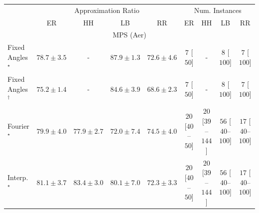 \begin{tabular}{l|cccc|cccc|}
\toprule
& \multicolumn{4}{c|}{Approximation Ratio} & \multicolumn{4}{c|}{Num. Instances} \\
            & ER & HH & LB & RR & ER & HH & LB & RR \\
\midrule
\multicolumn{9}{c}{\rule{0pt}{8pt}MPS (Aer)} \\
\midrule
Fixed Angles$^\star$ & {\cellcolor[HTML]{883E9B}} \color[HTML]{F1F1F1} $78.7\pm 3.5$ & {\cellcolor[HTML]{000000}} \color[HTML]{F1F1F1} {\cellcolor{white}} \color{black} - & {\cellcolor[HTML]{6A0867}} \color[HTML]{F1F1F1} $87.9\pm 1.3$ & {\cellcolor[HTML]{8C66AF}} \color[HTML]{F1F1F1} $72.6\pm 4.6$ & {\cellcolor[HTML]{FFF7F3}} \color[HTML]{000000} $7$ [$50$] & {\cellcolor[HTML]{000000}} \color[HTML]{F1F1F1} {\cellcolor{white}} \color{black} - & {\cellcolor[HTML]{FFF7F3}} \color[HTML]{000000} $8$ [$100$] & {\cellcolor[HTML]{FFF7F3}} \color[HTML]{000000} $7$ [$100$] \\
Fixed Angles$^\dagger$ & {\cellcolor[HTML]{8A55A7}} \color[HTML]{F1F1F1} $75.2\pm 1.4$ & {\cellcolor[HTML]{000000}} \color[HTML]{F1F1F1} {\cellcolor{white}} \color{black} - & {\cellcolor[HTML]{81127E}} \color[HTML]{F1F1F1} $84.6\pm 3.9$ & {\cellcolor[HTML]{8C80BB}} \color[HTML]{F1F1F1} $68.6\pm 2.3$ & {\cellcolor[HTML]{FFF7F3}} \color[HTML]{000000} $7$ [$50$] & {\cellcolor[HTML]{000000}} \color[HTML]{F1F1F1} {\cellcolor{white}} \color{black} - & {\cellcolor[HTML]{FFF7F3}} \color[HTML]{000000} $8$ [$100$] & {\cellcolor[HTML]{FFF7F3}} \color[HTML]{000000} $7$ [$100$] \\
Fourier$^\star$ & {\cellcolor[HTML]{863595}} \color[HTML]{F1F1F1} $79.9\pm 4.0$ & {\cellcolor[HTML]{88449E}} \color[HTML]{F1F1F1} $77.9\pm 2.7$ & {\cellcolor[HTML]{8C6AB1}} \color[HTML]{F1F1F1} $72.0\pm 7.4$ & {\cellcolor[HTML]{8A5AA9}} \color[HTML]{F1F1F1} $74.5\pm 4.0$ & {\cellcolor[HTML]{FFF4F0}} \color[HTML]{000000} $20$ [$40$--$50$] & {\cellcolor[HTML]{FFF4F0}} \color[HTML]{000000} $20$ [$39$--$144$] & {\cellcolor[HTML]{FEECE9}} \color[HTML]{000000} $56$ [$40$--$100$] & {\cellcolor[HTML]{FFF5F1}} \color[HTML]{000000} $17$ [$40$--$100$] \\
Interp.$^\star$ & {\cellcolor[HTML]{852D90}} \color[HTML]{F1F1F1} $81.1\pm 3.7$ & {\cellcolor[HTML]{831A83}} \color[HTML]{F1F1F1} $83.4\pm 3.0$ & {\cellcolor[HTML]{863394}} \color[HTML]{F1F1F1} $80.1\pm 7.0$ & {\cellcolor[HTML]{8C68AF}} \color[HTML]{F1F1F1} $72.3\pm 3.3$ & {\cellcolor[HTML]{FFF4F0}} \color[HTML]{000000} $20$ [$40$--$50$] & {\cellcolor[HTML]{FFF4F0}} \color[HTML]{000000} $20$ [$39$--$144$] & {\cellcolor[HTML]{FEECE9}} \color[HTML]{000000} $56$ [$40$--$100$] & {\cellcolor[HTML]{FFF5F1}} \color[HTML]{000000} $17$ [$40$--$100$] \\

\end{tabular}
